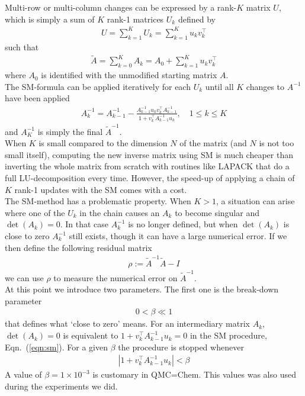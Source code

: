 \documentclass[11pt]{article}
\numberwithin{figure}{section}
\numberwithin{table}{section}
\begin{document}
			Multi-row or multi-column changes can be expressed by a rank-$K$ matrix $U$, which is simply a sum of $K$ rank-1 matrices $U_k$ defined by
			\begin{align}
				U = \sum_{k=1}^K U_k = \sum_{k=1}^K u_kv_k^\top
			\end{align}
			such that 
			\begin{align}\label{eqn:rank-k}
				\widetilde{A} = \sum_{k=0}^K A_k =  A_0 + \sum_{k=1}^K u_kv_k^\top
			\end{align}
			where $A_0$ is identified with the unmodified starting matrix $A$.\\
			
			The SM-formula can be applied iteratively for each $U_k$ until all $K$ changes to $A^{-1}$ have been applied
			\begin{align}\label{eqn:sm}
				A^{-1}_k = A^{-1}_{k-1} - \frac{A^{-1}_{k-1}u_kv_k^\top A^{-1}_{k-1}}{1+v_k^\top A^{-1}_{k-1}u_k}, \quad 1 \leq k \leq K   
			\end{align}
			and $A_K^{-1}$ is simply the final $\widetilde{A}^{-1}$.\\
			
			When $K$ is small compared to the dimension $N$ of the matrix (and $N$ is not too small itself), computing the new inverse matrix using SM is much cheaper than inverting the whole matrix from scratch with routines like LAPACK that do a full LU-decomposition every time. However, the speed-up of applying a chain of $K$ rank-1 updates with the SM comes with a cost.\\
			
			The SM-method has a problematic property. When $K>1$, a situation can arise where one of the $U_k$ in the chain causes an $A_k$ to become singular and $\det\left(A_k\right)=0$. In that case $A^{-1}_{k}$ is no longer defined, but when $\det\left(A_k\right)$ is close to zero $A^{-1}_{k}$ still exists, though it can have a large numerical error. If we  then define the following residual matrix
			\begin{align} \label{cond:singular}
				\rho := \widetilde{A}^{-1}\widetilde{A} - I
			\end{align}
			we can use $\rho$ to measure the numerical error on $\widetilde{A}^{-1}$.\\
			
			At this point we introduce two parameters. The first one is the break-down parameter
			\begin{align}\label{eqn:break-down-parameter}
				0 < \beta \ll 1
			\end{align}
			that defines what `close to zero' means. For an intermediary matrix $A_k$, $\det\left(A_k\right)=0$ is equivalent to $1+v_k^\top A^{-1}_{k-1}u_k=0$ in the SM procedure, Eqn.~(\ref{eqn:sm}). For a given $\beta$ the procedure is stopped whenever
			\begin{align}\label{eqn:break-down-condition}
				\left|1+v_k^\top A^{-1}_{k-1}u_k\right| < \beta
			\end{align}
			A value of $\beta = 1\times 10^{-3}$ is customary in QMC=Chem. This values was also used during the experiments we did.\\
			
\end{document}
